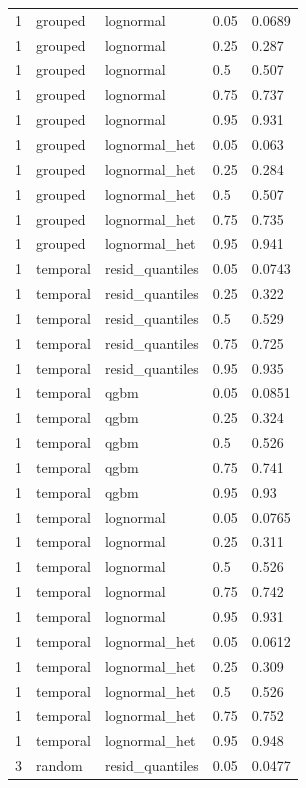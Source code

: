 \begin{tabular}{lllll}
1 & grouped & lognormal & 0.05 & 0.0689 \\
1 & grouped & lognormal & 0.25 & 0.287 \\
1 & grouped & lognormal & 0.5 & 0.507 \\
1 & grouped & lognormal & 0.75 & 0.737 \\
1 & grouped & lognormal & 0.95 & 0.931 \\
1 & grouped & lognormal\_het & 0.05 & 0.063 \\
1 & grouped & lognormal\_het & 0.25 & 0.284 \\
1 & grouped & lognormal\_het & 0.5 & 0.507 \\
1 & grouped & lognormal\_het & 0.75 & 0.735 \\
1 & grouped & lognormal\_het & 0.95 & 0.941 \\
1 & temporal & resid\_quantiles & 0.05 & 0.0743 \\
1 & temporal & resid\_quantiles & 0.25 & 0.322 \\
1 & temporal & resid\_quantiles & 0.5 & 0.529 \\
1 & temporal & resid\_quantiles & 0.75 & 0.725 \\
1 & temporal & resid\_quantiles & 0.95 & 0.935 \\
1 & temporal & qgbm & 0.05 & 0.0851 \\
1 & temporal & qgbm & 0.25 & 0.324 \\
1 & temporal & qgbm & 0.5 & 0.526 \\
1 & temporal & qgbm & 0.75 & 0.741 \\
1 & temporal & qgbm & 0.95 & 0.93 \\
1 & temporal & lognormal & 0.05 & 0.0765 \\
1 & temporal & lognormal & 0.25 & 0.311 \\
1 & temporal & lognormal & 0.5 & 0.526 \\
1 & temporal & lognormal & 0.75 & 0.742 \\
1 & temporal & lognormal & 0.95 & 0.931 \\
1 & temporal & lognormal\_het & 0.05 & 0.0612 \\
1 & temporal & lognormal\_het & 0.25 & 0.309 \\
1 & temporal & lognormal\_het & 0.5 & 0.526 \\
1 & temporal & lognormal\_het & 0.75 & 0.752 \\
1 & temporal & lognormal\_het & 0.95 & 0.948 \\
3 & random & resid\_quantiles & 0.05 & 0.0477 \\

\end{tabular}

